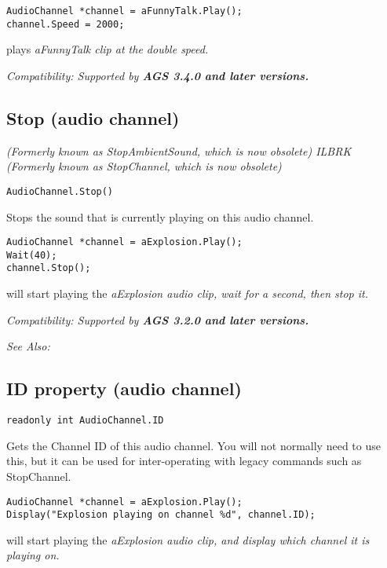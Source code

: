 \begin{verbatim}
AudioChannel *channel = aFunnyTalk.Play();
channel.Speed = 2000;
\end{verbatim}
plays \it{aFunnyTalk} clip at the double speed.

\it{Compatibility:} Supported by \bf{AGS 3.4.0} and later versions.


\subsection{Stop (audio channel)}\label{AudioChannel.Stop}%

\it{(Formerly known as StopAmbientSound, which is now obsolete)} ILBRK
\it{(Formerly known as StopChannel, which is now obsolete)}

\begin{verbatim}
AudioChannel.Stop()
\end{verbatim}
Stops the sound that is currently playing on this audio channel.

\begin{verbatim}
AudioChannel *channel = aExplosion.Play();
Wait(40);
channel.Stop();
\end{verbatim}
will start playing the \it{aExplosion} audio clip, wait for a second, then stop it.

\it{Compatibility:} Supported by \bf{AGS 3.2.0} and later versions.

\it{See Also:} 


\subsection{ID property (audio channel)}\label{AudioChannel.ID}%

\begin{verbatim}
readonly int AudioChannel.ID
\end{verbatim}
Gets the Channel ID of this audio channel. You will not normally need to use this,
but it can be used for inter-operating with legacy commands such as StopChannel.

\begin{verbatim}
AudioChannel *channel = aExplosion.Play();
Display("Explosion playing on channel %d", channel.ID);
\end{verbatim}
will start playing the \it{aExplosion} audio clip, and display which channel it is playing on.

